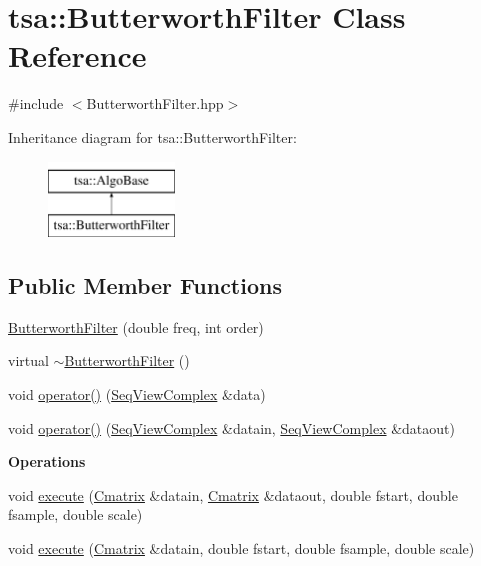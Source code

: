 \hypertarget{classtsa_1_1_butterworth_filter}{}\section{tsa\+:\+:Butterworth\+Filter Class Reference}
\label{classtsa_1_1_butterworth_filter}


{\ttfamily \#include $<$Butterworth\+Filter.\+hpp$>$}

Inheritance diagram for tsa\+:\+:Butterworth\+Filter\+:\begin{figure}[H]
\begin{center}
\leavevmode
\includegraphics[height=2.000000cm]{classtsa_1_1_butterworth_filter}
\end{center}
\end{figure}
\subsection*{Public Member Functions}
\begin{DoxyCompactItemize}
\item 
\hyperlink{classtsa_1_1_butterworth_filter_a593153a0d04510ed85ddf1464c68dc74}{Butterworth\+Filter} (double freq, int order)
\item 
virtual \hyperlink{classtsa_1_1_butterworth_filter_a085e8ea21b5fb0d564513bca234318df}{$\sim$\+Butterworth\+Filter} ()
\item 
void \hyperlink{classtsa_1_1_butterworth_filter_aa38eef705674e3c799e23bd145d243c0}{operator()} (\hyperlink{namespacetsa_ab32775c889b53c40fa83939f22372b75}{Seq\+View\+Complex} \&data)
\item 
void \hyperlink{classtsa_1_1_butterworth_filter_a68cf85f26d694402fe52601707cf9bbb}{operator()} (\hyperlink{namespacetsa_ab32775c889b53c40fa83939f22372b75}{Seq\+View\+Complex} \&datain, \hyperlink{namespacetsa_ab32775c889b53c40fa83939f22372b75}{Seq\+View\+Complex} \&dataout)
\end{DoxyCompactItemize}
\begin{Indent}\textbf{ Operations}\par
\begin{DoxyCompactItemize}
\item 
void \hyperlink{classtsa_1_1_butterworth_filter_a3e0223e447ec10bd00d488652abb702f}{execute} (\hyperlink{namespacetsa_a86348fef1603a135fe5fba9e5f5486ee}{Cmatrix} \&datain, \hyperlink{namespacetsa_a86348fef1603a135fe5fba9e5f5486ee}{Cmatrix} \&dataout, double fstart, double fsample, double scale)
\item 
void \hyperlink{classtsa_1_1_butterworth_filter_acff437ecb48fcb6cae8865bba97ac533}{execute} (\hyperlink{namespacetsa_a86348fef1603a135fe5fba9e5f5486ee}{Cmatrix} \&datain, double fstart, double fsample, double scale)
\end{DoxyCompactItemize}
\end{Indent}
